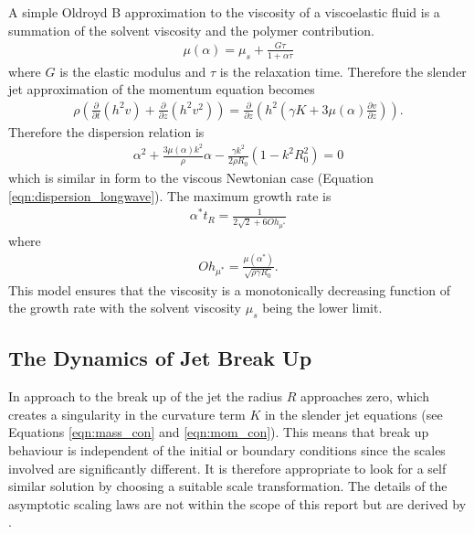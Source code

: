 \documentclass[11pt]{article}
\newcommand{\pd}[2]{\frac{\partial #1}{\partial #2}}
\begin{document}
A simple Oldroyd B approximation to the viscosity of a viscoelastic fluid is a summation of the solvent viscosity and the polymer contribution. 
\begin{align}
\mu(\alpha) = \mu_s + \frac{G \tau}{1 + \alpha \tau}
\end{align}
where $G$ is the elastic modulus and $\tau$  is the relaxation time. Therefore the slender jet approximation of the momentum equation becomes
\begin{align*}
\rho \left( \pd{}{t} (h^2v) + \pd{}{z} (h^2v^2) \right) = \pd{}{z} \left(h^2 \left( \gamma K + 3 \mu(\alpha) \pd{v}{z}\right) \right).
\end{align*}
Therefore the dispersion relation is
\begin{align}
\alpha^2 + \frac{3 \mu(\alpha) k^2}{\rho}\alpha - \frac{\gamma k^2}{2 \rho R_0}(1 - k^2R_0^2) = 0
\label{eqn:dispersion_viscoelastic}
\end{align}
which is similar in form to the viscous Newtonian case (Equation \ref{eqn:dispersion_longwave}). The maximum growth rate is
\begin{align*}
\alpha^* t_R = \frac{1}{2 \sqrt{2} + 6 Oh_{\mu^*}}
\end{align*}
where
\begin{align*}
Oh_{\mu^*} = \frac{\mu(\alpha^*)}{\sqrt{\rho \gamma R_0}}.
\end{align*}
This model ensures that the viscosity is a monotonically decreasing function of the growth rate with the solvent viscosity $\mu_s$ being the lower limit. 

\subsection{The Dynamics of Jet Break Up}
In approach to the break up of the jet the radius $R$ approaches zero, which creates a singularity in the curvature term $K$ in the slender jet equations (see Equations \ref{eqn:mass_con} and \ref{eqn:mom_con}). This means that break up behaviour is independent of the initial or boundary conditions since the scales involved are significantly different. It is therefore appropriate to look for a self similar solution by choosing a suitable scale transformation. The details of the asymptotic scaling laws are not within the scope of this report but are derived by \cite{eggers2005drop}.
\end{document}
